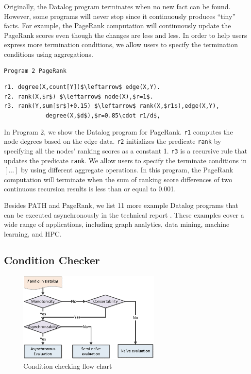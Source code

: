 Originally, the Datalog program terminates when no new fact can be found. However, some programs will never stop since it continuously produces ``tiny'' facts. For example, the PageRank computation will continuously update the PageRank scores even though the changes are less and less. In order to help users express more termination conditions, we allow users to specify the termination conditions using aggregations.


\begin{verbatim}
Program 2 PageRank
\end{verbatim}
\vspace{-0.1in}
\small
\begin{lstlisting}
r1. degree(X,count[Y])$\leftarrow$ edge(X,Y).
r2. rank(X,$r$) $\leftarrow$ node(X),$r=1$.
r3. rank(Y,sum[$r$]+0.15) $\leftarrow$ rank(X,$r1$),edge(X,Y),
			degree(X,$d$),$r=0.85\cdot r1/d$,
\end{lstlisting}
\normalsize

In Program 2, we show the Datalog program for PageRank. \texttt{r1} computes the node degrees based on the edge data. \texttt{r2} initializes the predicate \texttt{rank} by specifying all the nodes' ranking scores as a constant 1. \texttt{r3} is a recursive rule that updates the predicate \texttt{rank}. We allow users to specify the terminate conditions in $[\ldots]$ by using different aggregate operations. In this program, the PageRank computation will terminate when the sum of ranking score differences of two continuous recursion results is less than or equal to 0.001.

Besides PATH and PageRank, we list 11 more example Datalog programs that can be executed asynchronously in the technical report \cite{fullversion}. These examples cover a wide range of applications, including graph analytics, data mining, machine learning, and HPC.

\subsection{Condition Checker}
\label{sec:system:condition}

\begin{figure}[!t]
    \centering
  \includegraphics[width=2.8in]{fig/flow}
  \vspace{-0.1in}
  \caption{Condition checking flow chart}
  \label{fig:flow}
  \vspace{-0.2in}
\end{figure}

